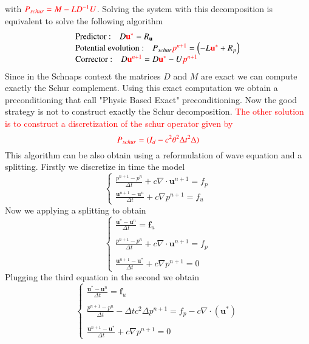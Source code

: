 \documentclass[a4paper,twoside,french,english,11pt]{article}
\newcommand{\ds}{\displaystyle}
\begin{document}
with $\textcolor{red}{P_{schur}=M-LD^{-1}U}$. Solving the system with this decomposition is equivalent to solve the following algorithm 
$$
\left.\begin{array}{l}
\mbox{Predictor :\quad} D \textcolor{red}{\mathbf{u}^*}=R_{\mathbf{u}}\\
\mbox{Potential evolution :\quad} P_{schur}\textcolor{red}{p^{n+1}}=\left(-L\textcolor{red}{\mathbf{u}^*}+R_{p}\right)\\
\mbox{Corrector :\quad}  D\textcolor{red}{\mathbf{u}^{n+1}}=D\textcolor{red}{\mathbf{u}^*}-U\textcolor{red}{p^{n+1}}\end{array}\right.
$$
Since in the Schnaps context the matrices $D$ and $M$ are exact we can compute exactly the Schur complement. Using this exact computation we obtain a preconditioning that call "Physic Based Exact" preconditioning.
Now the good strategy is not to construct exactly the Schur decomposition. \textcolor{red}{The other solution is to construct a discretization of the schur operator given by}
$$
\displaystyle \textcolor{red}{P_{schur}=(I_d-c^2\theta^2 \Delta t^2 \Delta )}
$$
This algorithm can be also obtain using a reformulation of wave equation and a splitting. Firstly we discretize in time the model
$$
\left\{\begin{array}{l}
\ds \frac{p^{n+1}-p^n}{\Delta t}+c\nabla \cdot \bm{u}^{n+1}= f_p \\
\ds \frac{\bm{u}^{n+1}-\bm{u}^n}{\Delta t} +c\nabla p^{n+1} = f_u \end{array}\right.
$$
Now we applying a splitting to obtain
$$
\left\{\begin{array}{l}
\ds \frac{\bm{u}^{*}-\bm{u}^n}{\Delta t}  = \mathbf{f}_u\\
~\\
\ds \frac{p^{n+1}-p^n}{\Delta t}+ c\nabla \cdot  \mathbf{u}^{n+1}= f_p\\
~\\
\ds \frac{\bm{u}^{n+1}-\bm{u}^*}{\Delta t} +c\nabla p^{n+1} = 0 \end{array}\right.
$$
Plugging the third equation in the second we obtain
$$
\left\{\begin{array}{l}
\ds \frac{\bm{u}^{*}-\bm{u}^n}{\Delta t}  = \mathbf{f}_u\\
~\\
\ds \frac{p^{n+1}-p^n}{\Delta t}- \Delta t c^2\Delta p^{n+1} = f_p-c\nabla \cdot (\bm{u}^*) \\
~\\
\ds \frac{\bm{u}^{n+1}-\bm{u}^*}{\Delta t} +c\nabla p^{n+1} = 0 \end{array}\right.
$$
\end{document}
